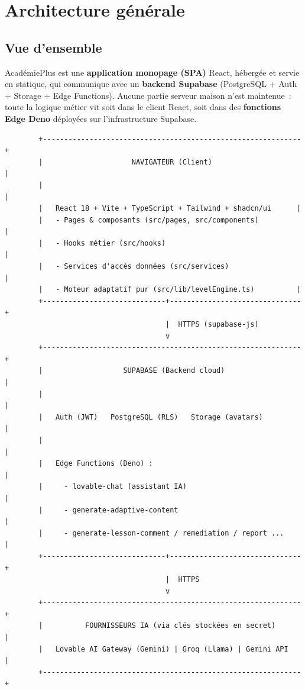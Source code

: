 \chapter{Architecture générale}

\section{Vue d'ensemble}
AcadémiePlus est une \textbf{application monopage (SPA)} React, hébergée et
servie en statique, qui communique avec un \textbf{backend Supabase}
(PostgreSQL + Auth + Storage + Edge Functions). Aucune partie serveur \og maison\fg{}
n'est maintenue~: toute la logique métier vit soit dans le client React, soit
dans des \textbf{fonctions Edge Deno} déployées sur l'infrastructure Supabase.

\begin{verbatim}
        +-------------------------------------------------------------+
        |                     NAVIGATEUR (Client)                     |
        |                                                             |
        |   React 18 + Vite + TypeScript + Tailwind + shadcn/ui      |
        |   - Pages & composants (src/pages, src/components)          |
        |   - Hooks métier (src/hooks)                                |
        |   - Services d'accès données (src/services)                 |
        |   - Moteur adaptatif pur (src/lib/levelEngine.ts)          |
        +-----------------------------+-------------------------------+
                                      |  HTTPS (supabase-js)
                                      v
        +-------------------------------------------------------------+
        |                   SUPABASE (Backend cloud)                  |
        |                                                             |
        |   Auth (JWT)   PostgreSQL (RLS)   Storage (avatars)         |
        |                                                             |
        |   Edge Functions (Deno) :                                   |
        |     - lovable-chat (assistant IA)                           |
        |     - generate-adaptive-content                             |
        |     - generate-lesson-comment / remediation / report ...    |
        +-----------------------------+-------------------------------+
                                      |  HTTPS
                                      v
        +-------------------------------------------------------------+
        |          FOURNISSEURS IA (via clés stockées en secret)      |
        |   Lovable AI Gateway (Gemini) | Groq (Llama) | Gemini API   |
        +-------------------------------------------------------------+
\end{verbatim}

